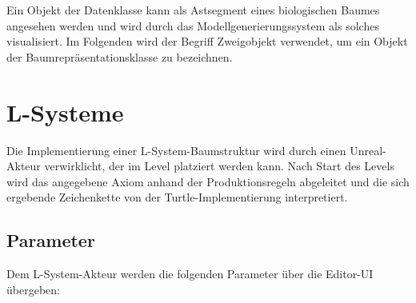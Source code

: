 Ein Objekt der Datenklasse kann als Astsegment eines biologischen Baumes angesehen werden und wird durch das Modellgenerierungssystem als solches visualisiert. Im Folgenden wird der Begriff \glqq Zweigobjekt\grqq{} verwendet, um ein Objekt der Baumrepräsentationsklasse zu bezeichnen.

\section{L-Systeme}

Die Implementierung einer L-System-Baumstruktur wird durch einen Unreal-Akteur verwirklicht, der im Level platziert werden kann. Nach Start des Levels wird das angegebene Axiom anhand der Produktionsregeln abgeleitet und die sich ergebende Zeichenkette von der Turtle-Implementierung interpretiert.

\subsection{Parameter}

Dem L-System-Akteur werden die folgenden Parameter über die Editor-UI übergeben:

